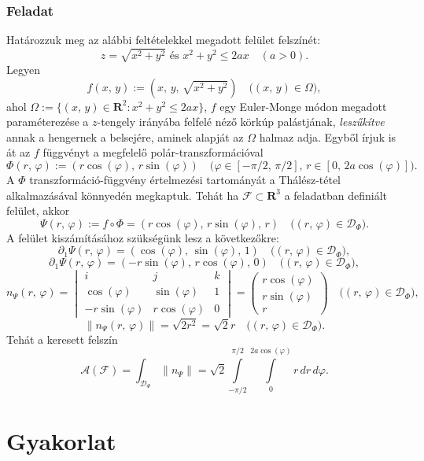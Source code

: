 \documentclass{article}
\newcommand{\R}{\mathbf{R}}
\begin{document}
	\subsubsection{Feladat}
	Határozzuk meg az alábbi feltételekkel megadott felület felszínét:
	\[
		z = \sqrt{x^2 + y^2} \text{ és } x^2 + y^2 \leq 2ax \quad (a > 0).
	\]
	Legyen
	\[
		f(x, \, y) := (x, \, y, \, \sqrt{x^2 + y^2}) \quad \big( (x, \, y) \in \Omega \big),
	\]
	ahol $\Omega := \{ (x, \, y) \in \R^2 : x^2 + y^2 \leq 2 ax \}$, $f$ egy Euler-Monge módon megadott paraméterezése a $z$-tengely irányába felfelé néző körkúp palástjának, \textit{leszűkítve} annak a hengernek a belsejére, aminek alapját az $\Omega$ halmaz adja. Egyből írjuk is át az $f$ függvényt a megfelelő polár-transzformációval
	\[
		\Phi(r, \, \varphi) := (r \cos(\varphi), \, r \sin(\varphi)) \quad \big( \varphi \in [- \pi / 2, \, \pi / 2], \, r \in [0, \, 2a \cos(\varphi)]\big).
	\]
	A $\Phi$ transzformáció-függvény értelmezési tartományát a Thálész-tétel alkalmazásával könnyedén megkaptuk. Tehát ha $\mathcal{F} \subset \R^3$ a feladatban definiált felület, akkor
	\[
		\Psi(r, \, \varphi) := f \circ \Phi = (r \cos(\varphi), \, r \sin(\varphi), \, r) \quad \big( (r, \, \varphi) \in \mathcal{D}_\Phi \big).
	\]
	A felület kiszámításához szükségünk lesz a következőkre:
	\[
		\partial_1 \Psi(r, \, \varphi) = (\cos(\varphi), \, \sin(\varphi), \, 1) \quad \big( (r, \, \varphi) \in \mathcal{D}_\Phi \big),
	\]
	\[
		\partial_1 \Psi(r, \, \varphi) = (-r \sin(\varphi), \, r \cos(\varphi), \, 0) \quad \big( (r, \, \varphi) \in \mathcal{D}_\Phi \big),
	\]
	\[
		n_\Psi(r, \, \varphi) = \begin{vmatrix}
			i & j & k \\
			\cos(\varphi) & \sin(\varphi) & 1 \\
			-r\sin(\varphi) & r\cos(\varphi) & 0
		\end{vmatrix} =
		\begin{pmatrix}
			r\cos(\varphi) \\
			r\sin(\varphi) \\
			r
		\end{pmatrix} \quad \big( (r, \, \varphi) \in \mathcal{D}_\Phi \big),
	\]
	\[
		\|n_\Psi(r, \, \varphi)\| = \sqrt{2r^2} = \sqrt{2} r \quad \big( (r, \, \varphi) \in \mathcal{D}_\Phi \big).
	\]
	Tehát a keresett felszín
	\[
		\mathcal{A}(\mathcal{F}) = \int_{\mathcal{D}_\Phi} \|n_\Psi\| = \sqrt{2} \int\limits_{-\pi/2}^{\pi/2} \int\limits_0^{2a\cos(\varphi)} r \, dr \, d\varphi.
	\]

	\newpage
	\section{Gyakorlat}
\end{document}
